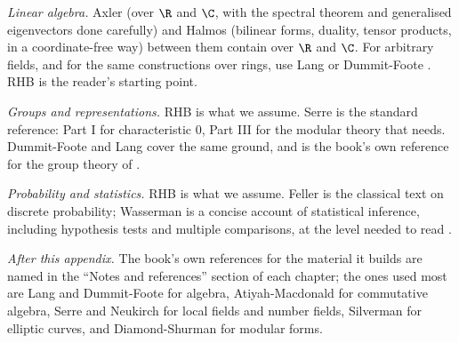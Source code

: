 \emph{Linear algebra.} Axler \cite{Axler15} (over $\R$ and $\C$, with the spectral theorem and
generalised eigenvectors done carefully) and Halmos \cite{Halmos74} (bilinear forms, duality,
tensor products, in a coordinate-free way) between them contain  over
$\R$ and $\C$. For arbitrary fields, and for the same constructions over rings, use Lang
\cite[Chapters XIII to XVI]{Lang} or Dummit-Foote \cite[Chapters 11 and 12, and Section
10.4]{DummitFoote}. RHB \cite[Chapter 8]{RHB06} is the reader's starting point.

\emph{Groups and representations.} RHB \cite[Chapters 28 and 29]{RHB06} is what we assume. Serre
\cite{SerreLinearReps} is the standard reference: Part I for characteristic $0$, Part III for the
modular theory that  needs. Dummit-Foote \cite[Chapters 18 and 19]{DummitFoote} and
Lang \cite[Chapter XVIII]{Lang} cover the same ground, and \cite[Chapters 1 to 6]{DummitFoote} is
the book's own reference for the group theory of .

\emph{Probability and statistics.} RHB \cite[Chapters 30 and 31]{RHB06} is what we assume. Feller
\cite{Feller68} is the classical text on discrete probability; Wasserman \cite{Wasserman04} is a
concise account of statistical inference, including hypothesis tests and multiple comparisons, at
the level needed to read .

\emph{After this appendix.} The book's own references for the material it builds are named in the
``Notes and references'' section of each chapter; the ones used most are Lang \cite{Lang} and
Dummit-Foote \cite{DummitFoote} for algebra, Atiyah-Macdonald \cite{AtiyahMacdonald} for
commutative algebra, Serre \cite{SerreLocalFields} and Neukirch \cite{Neukirch} for local fields and
number fields, Silverman \cite{SilvermanAEC,SilvermanATAEC} for elliptic curves, and
Diamond-Shurman \cite{DiamondShurman} for modular forms.

